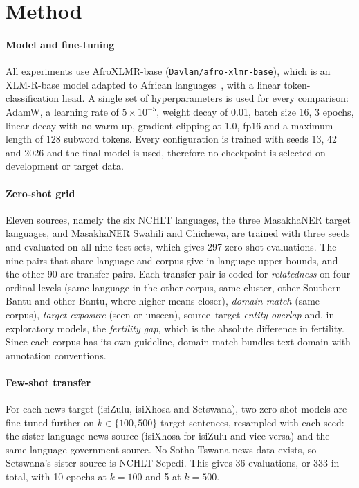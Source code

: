 \section{Method}\label{sec:method}

\paragraph{Model and fine-tuning} All experiments use AfroXLMR-base (\texttt{Davlan/afro-xlmr-base}), which is an XLM-R-base model adapted to African languages~\cite{alabi2022}, with a linear token-classification head. A single set of hyperparameters is used for every comparison: AdamW, a learning rate of $5\times10^{-5}$, weight decay of 0.01, batch size 16, 3 epochs, linear decay with no warm-up, gradient clipping at 1.0, fp16 and a maximum length of 128 subword tokens. Every configuration is trained with seeds 13, 42 and 2026 and the final model is used, therefore no checkpoint is selected on development or target data.

\paragraph{Zero-shot grid} Eleven sources, namely the six NCHLT languages, the three MasakhaNER target languages, and MasakhaNER Swahili and Chichewa, are trained with three seeds and evaluated on all nine test sets, which gives 297 zero-shot evaluations. The nine pairs that share language and corpus give in-language upper bounds, and the other 90 are transfer pairs. Each transfer pair is coded for \emph{relatedness} on four ordinal levels (same language in the other corpus, same cluster, other Southern Bantu and other Bantu, where higher means closer), \emph{domain match} (same corpus), \emph{target exposure} (seen or unseen), source--target \emph{entity overlap} and, in exploratory models, the \emph{fertility gap}, which is the absolute difference in fertility. Since each corpus has its own guideline, domain match bundles text domain with annotation conventions.

\paragraph{Few-shot transfer} For each news target (isiZulu, isiXhosa and Setswana), two zero-shot models are fine-tuned further on $k\in\{100,500\}$ target sentences, resampled with each seed: the sister-language news source (isiXhosa for isiZulu and vice versa) and the same-language government source. No Sotho-Tswana news data exists, so Setswana's sister source is NCHLT Sepedi. This gives 36 evaluations, or 333 in total, with 10 epochs at $k=100$ and 5 at $k=500$.

